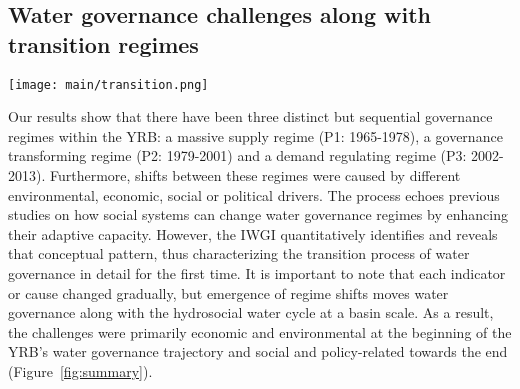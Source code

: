 \subsection{Water governance challenges along with transition regimes}

\begin{figure*}[htbp!]
	\centering
	\texttt{[image: main/transition.png]}
	\caption{
		Transition schema of water governance during transformation towards a hydrosocial water cycle. The natural water cycle dominates blue pathways while socio-economic feedbacks dominate red pathways. Finally, there is a transformation towards the hydrosocial water cycle where red loop increases.
		\textbf{A. Early phase.} As socio-economic systems develop, industry and services gradually demand increasing amounts of water; at the same time, increasing social organization and technological capacity allow people to manage water resources more intensively, including intensive intervention in the natural water cycle.
		\textbf{B. Late phase} With further developed and economically efficient industries and services, trade-offs between provisioning-purpose and non-provisioning water use become prominent. Rather than being determined by local socio-economic systems, water withdraws and management are scaled up to the entire basin.
		Thus, \textbf{C. Transformation from a natural water cycle towards the hydro-social water cycle} occurs in paralleled with a transformation towards a hydrosocial water cycle. This is generally distinguished when water resource limits are reached. The three water governance regimes seen in the YRB are identified along this transition (Regime 1: massive supply regime, Regime 2: purpose-focused regime, Regime 3: many-sided governance regime).
		\textbf{D. Water governance challenges} Through the transitional regimes, water governance faces primarily economic and environmental challenges in the early phase and social and policy challenges in the late phase.
	}
	\label{fig:summary}
\end{figure*}

Our results show that there have been three distinct but sequential governance regimes within the YRB: a massive supply regime (P1: 1965-1978), a governance transforming regime (P2: 1979-2001) and a demand regulating regime (P3: 2002-2013). Furthermore, shifts between these regimes were caused by different environmental, economic, social or political drivers.
The process echoes previous studies on how social systems can change water governance regimes by enhancing their adaptive capacity. However, the IWGI quantitatively identifies and reveals that conceptual pattern, thus characterizing the transition process of water governance in detail for the first time.
It is important to note that each indicator or cause changed gradually, but emergence of regime shifts moves water governance along with the hydrosocial water cycle at a basin scale.
As a result, the challenges were primarily economic and environmental at the beginning of the YRB's water governance trajectory and social and policy-related towards the end (Figure~\ref{fig:summary}).

